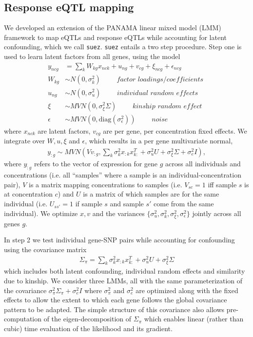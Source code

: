 \documentclass{article}
\begin{document}
{\subsection*{Response eQTL mapping} 

We developed an extension of the PANAMA\cite{Fusi2012} linear mixed model (LMM) framework to map eQTLs and response eQTLs while accounting for latent confounding, which we call \texttt{suez}. \texttt{suez} entails a two step procedure. Step one is used to learn latent factors from all genes, using the model
\begin{align*}
y_{ncg} &= \sum_k W_{kg} x_{nck} + u_{ng} + v_{cg} + \xi_{ncg} + \epsilon_{ncg} \\
W_{kg} & \sim N(0, \sigma^2_k ) \qquad \textit{ factor loadings/coefficients } \\ 
u_{ng} &\sim N(0, \sigma^2_u) \qquad \textit{ individual random effects } \\
\xi &\sim MVN(0, \sigma^2_\xi \Sigma ) \qquad \textit{ kinship random effect }  \\
\epsilon &\sim MVN(0, \text{diag}(\sigma^2_\epsilon)) \qquad \textit{ noise } 
\end{align*}
where $x_{nck}$ are latent factors, $v_{cg}$ are per gene, per concentration fixed effects. We integrate over $W, u, \xi$ and $\epsilon$, which results in a per gene multivariate normal,
\begin{align}
y_{:g} \sim MVN\left( V v_{:g} , \sum_k \sigma^2_k x_{:k} x_{k:}^T + \sigma^2_u U + \sigma^2_\xi \Sigma + \sigma^2_e I \right),
\end{align}
where $y_{:g}$ refers to the vector of expression for gene $g$ across all individuals and concentrations (i.e. all ``samples'' where a sample is an individual-concentration pair), $V$ is a matrix mapping concentrations to samples (i.e. $V_{sc}=1$ iff sample $s$ is at concentration $c$) and $U$ is a matrix of which samples are for the same individual (i.e. $U_{ss'}=1$ if sample $s$ and sample $s'$ come from the same individual). We optimize $x,v$ and the variances $\{ \sigma^2_u, \sigma^2_k,  \sigma^2_\xi, \sigma^2_\epsilon \}$ jointly across all genes $g$. 

In step 2 we test individual gene-SNP pairs while accounting for confounding using the covariance matrix 
\begin{align}
 \Sigma_\pi = \sum_k \sigma^2_k x_{:k} x_{k:}^T + \sigma^2_u U + \sigma^2_\xi \Sigma 
 \end{align}
which includes both latent confounding, individual random effects and similarity due to kinship. We consider three LMMs, all with the same parameterization of the covariance $\sigma^2_\pi \Sigma_\pi + \sigma^2_e I$ where $\sigma^2_\pi$ and $\sigma^2_e$ are optimized along with the fixed effects to allow the extent to which each gene follows the global covariance pattern to be adapted. The simple structure of this covariance also allows pre-computation of the eigen-decomposition of $\Sigma_\pi$ which enables linear (rather than cubic) time evaluation of the likelihood and its gradient. 

}
\end{document}
